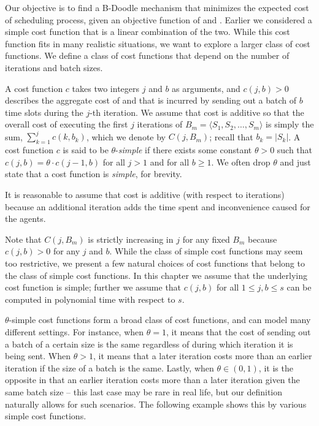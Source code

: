 Our objective is to find a B-Doodle mechanism that minimizes the expected cost of scheduling process, given an objective function of \Times and \Inconvenience.  Earlier we considered a simple cost function that is a linear combination of the two.  While this cost function fits in many realistic situations, we want to explore a larger class of cost functions. We define a class of cost functions that depend on the number of iterations and batch sizes.
\begin{definition} \label{bdoodle:def:cost-function}
A cost function $c$ takes two integers $j$ and $b$ as arguments, and $c(j, b) > 0$ describes the aggregate cost of \Times and \Inconveniences that is incurred by sending out a batch of $b$ time slots during the $j$-th iteration. We assume that cost is additive so that the overall cost of executing the first $j$ iterations of ${B}_m = \langle S_1, S_2, \dots, S_m \rangle$ is simply the sum, $\sum_{k=1}^{j} c(k, b_k)$, which we denote by $C(j, {B}_m)$; recall that $b_k = |S_k|$. 
A cost function $c$ is said to be $\theta$-\emph{simple} if there exists some constant $\theta>0$ such that $c(j, b) = \theta \cdot c(j-1, b)$ for all $j > 1$ and for all $b \geq 1$. We often drop $\theta$ and just state that a cost function is \emph{simple}, for brevity.
\end{definition}
It is reasonable to assume that cost is additive (with respect to iterations) because an additional iteration adds the time spent and inconvenience caused for the agents.

Note that $C(j, B_{m})$ is strictly increasing in $j$ for any fixed $B_{m}$ because $c(j, b) > 0$ for any $j$ and $b$. While the class of simple cost functions may seem too restrictive, we present a few natural choices of cost functions that belong to the class of simple cost functions. In this chapter we assume that the underlying cost function is simple; further we assume that $c(j, b)$ for all $1 \leq j, b \leq s$ can be computed in polynomial time with respect to $s$.

$\theta$-simple cost functions form a broad class of cost functions, and can model many different settings. 
For instance, when $\theta = 1$, it means that the cost of sending out a batch of a certain size is the same regardless of during which iteration it is being sent. When $\theta > 1$, it means that a later iteration costs more than an earlier iteration if the size of a batch is the same. Lastly, when $\theta \in (0, 1)$, it is the opposite in that an earlier iteration costs more than a later iteration given the same batch size -- this last case may be rare in real life, but our definition naturally allows for such scenarios.
The following example shows this by various simple cost functions. 


